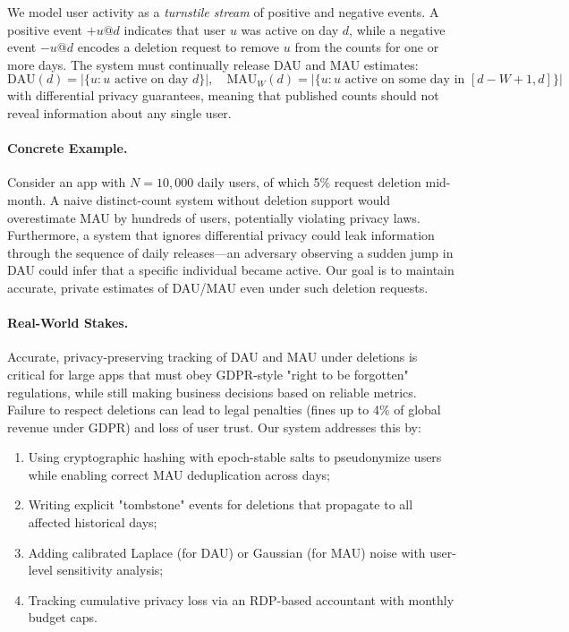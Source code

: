 \documentclass[11pt]{article}
\begin{document}
We model user activity as a \emph{turnstile stream} of positive and negative events. A positive event $+u@d$ indicates that user $u$ was active on day $d$, while a negative event $-u@d$ encodes a deletion request to remove $u$ from the counts for one or more days. The system must continually release DAU and MAU estimates:
\[
\text{DAU}(d) = \bigl|\{u : u \text{ active on day } d\}\bigr|, \quad
\text{MAU}_W(d) = \bigl|\{u : u \text{ active on some day in } [d-W+1,d]\}\bigr|
\]
with differential privacy guarantees, meaning that published counts should not reveal information about any single user.

\paragraph{Concrete Example.} Consider an app with $N=10{,}000$ daily users, of which 5\% request deletion mid-month. A naive distinct-count system without deletion support would overestimate MAU by hundreds of users, potentially violating privacy laws. Furthermore, a system that ignores differential privacy could leak information through the sequence of daily releases---an adversary observing a sudden jump in DAU could infer that a specific individual became active. Our goal is to maintain accurate, private estimates of DAU/MAU even under such deletion requests.

\paragraph{Real-World Stakes.} Accurate, privacy-preserving tracking of DAU and MAU under deletions is critical for large apps that must obey GDPR-style "right to be forgotten" regulations, while still making business decisions based on reliable metrics. Failure to respect deletions can lead to legal penalties (fines up to 4\% of global revenue under GDPR) and loss of user trust. Our system addresses this by:
\begin{enumerate}[leftmargin=*]
    \item Using cryptographic hashing with epoch-stable salts to pseudonymize users while enabling correct MAU deduplication across days;
    \item Writing explicit "tombstone" events for deletions that propagate to all affected historical days;
    \item Adding calibrated Laplace (for DAU) or Gaussian (for MAU) noise with user-level sensitivity analysis;
    \item Tracking cumulative privacy loss via an RDP-based accountant with monthly budget caps.
\end{enumerate}
\end{document}

